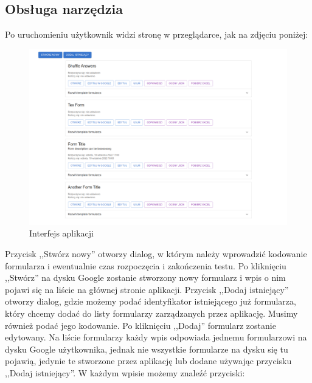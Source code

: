 \subsection{Obsługa narzędzia}
Po uruchomieniu użytkownik widzi stronę w przeglądarce, jak na zdjęciu poniżej:
\begin{figure}[H]
 \centering
  \includegraphics[scale=0.26]{strona.png}
  \caption{Interfejs aplikacji}
  \label{fig:2}
\end{figure}
Przycisk ,,Stwórz nowy'' otworzy dialog, w którym należy wprowadzić kodowanie 
formularza i ewentualnie czas rozpoczęcia i zakończenia testu. Po kliknięciu 
,,Stwórz'' na dysku Google zostanie stworzony nowy formularz i wpis o nim pojawi
się na liście na głównej stronie aplikacji. Przycisk ,,Dodaj istniejący'' otworzy
dialog, gdzie możemy podać identyfikator istniejącego już formularza, który chcemy
dodać do listy formularzy zarządzanych przez aplikację. Musimy również podać jego
kodowanie. Po kliknięciu ,,Dodaj'' formularz zostanie edytowany. 
Na liście formularzy każdy wpis odpowiada jednemu formularzowi
na dysku Google użytkownika, jednak nie wszystkie formularze na dysku się tu pojawią,
jedynie te stworzone przez aplikację lub dodane używając przycisku ,,Dodaj istniejący''.
W każdym wpisie możemy znaleźć przyciski:
